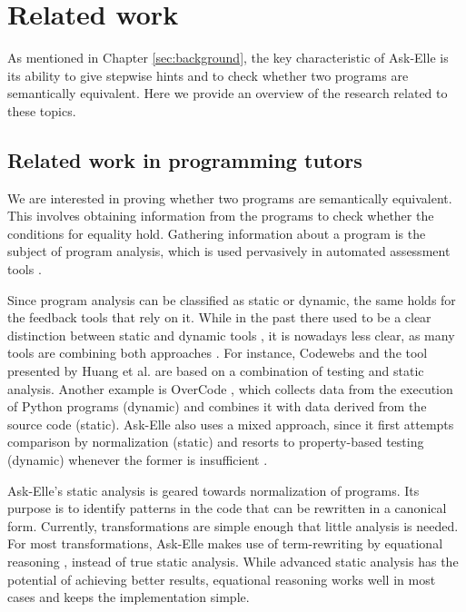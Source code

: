 \chapter{Related work}
\label{sec:related-work}

As mentioned in Chapter \ref{sec:background}, the key characteristic of Ask-Elle is its ability to give stepwise hints and to check whether two programs are semantically equivalent. Here we provide an overview of the research related to these topics.

\section{Related work in programming tutors}

We are interested in proving whether two programs are semantically equivalent. This involves obtaining information from the programs to check whether the conditions for equality hold. Gathering information about a program is the subject of program analysis, which is used pervasively in automated assessment tools \cite{2016feedbackreview}.

Since program analysis can be classified as static or dynamic, the same holds for the feedback tools that rely on it. While in the past there used to be a clear distinction between static and dynamic tools \cite{2005alasurvey}, it is nowadays less clear, as many tools are combining both approaches \cite{2016feedbackreview}. For instance, Codewebs \cite{2014codewebs} and the tool presented by Huang et al. \cite{2013huang} are based on a combination of testing and static analysis. Another example is OverCode \cite{2015overcode}, which collects data from the execution of Python programs (dynamic) and combines it with data derived from the source code (static). Ask-Elle also uses a mixed approach, since it first attempts comparison by normalization (static) and resorts to property-based testing (dynamic) whenever the former is insufficient \cite{2010askelle, 2017askelle}.

Ask-Elle's static analysis is geared towards normalization of programs. Its purpose is to identify patterns in the code that can be rewritten in a canonical form. Currently, transformations are simple enough that little analysis is needed. For most transformations, Ask-Elle makes use of term-rewriting by equational reasoning \cite{1998termrewriting}, instead of true static analysis. While advanced static analysis has the potential of achieving better results, equational reasoning works well in most cases and keeps the implementation simple.

